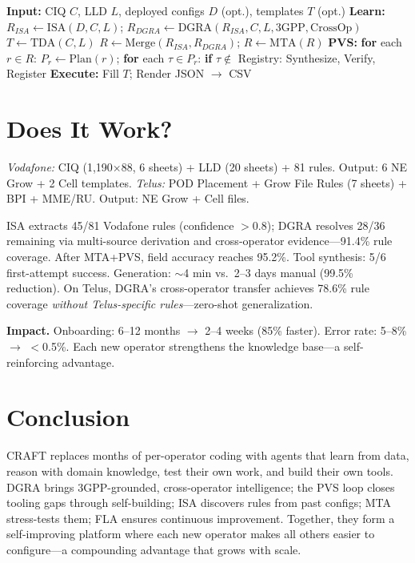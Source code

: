 \documentclass[10pt]{article}
\begin{document}
	\begin{algorithm}[h]
		\caption{CRAFT: Plan-Verify-Synthesize with DGRA}
		\begin{algorithmic}[1]
			\STATE \textbf{Input:} CIQ $C$, LLD $L$, deployed configs $D$ (opt.), templates $T$ (opt.)
			\STATE \textbf{Learn:} $R_{ISA} \leftarrow \text{ISA}(D, C, L)$; $R_{DGRA} \leftarrow \text{DGRA}(R_{ISA}, C, L, \text{3GPP}, \text{CrossOp})$
			 \STATE $T \leftarrow \text{TDA}(C, L)$ \ENDIF
			\STATE $R \leftarrow \text{Merge}(R_{ISA}, R_{DGRA})$; $R \leftarrow \text{MTA}(R)$
			\STATE \textbf{PVS:} \textbf{for} each $r \in R$: $P_r \leftarrow \text{Plan}(r)$; \textbf{for} each $\tau \in P_r$:
			\STATE \hspace{1em} \textbf{if} $\tau \notin$ Registry: Synthesize, Verify, Register
			\STATE \textbf{Execute:} Fill $T$; Render JSON $\to$ CSV
		\end{algorithmic}
	\end{algorithm}
	
	\section{Does It Work?}
	
	\emph{Vodafone:} CIQ (1,190$\times$88, 6 sheets) + LLD (20 sheets) + 81 rules. Output: 6 NE Grow + 2 Cell templates. \emph{Telus:} POD Placement + Grow File Rules (7 sheets) + BPI + MME/RU. Output: NE Grow + Cell files.
	
	ISA extracts 45/81 Vodafone rules (confidence $>0.8$); DGRA resolves 28/36 remaining via multi-source derivation and cross-operator evidence---91.4\% rule coverage. After MTA+PVS, field accuracy reaches 95.2\%. Tool synthesis: 5/6 first-attempt success. Generation: $\sim$4 min vs.\ 2--3 days manual (99.5\% reduction). On Telus, DGRA's cross-operator transfer achieves 78.6\% rule coverage \emph{without Telus-specific rules}---zero-shot generalization.
	
	\textbf{Impact.} Onboarding: 6--12 months $\to$ 2--4 weeks (85\% faster). Error rate: 5--8\% $\to$ $<$0.5\%. Each new operator strengthens the knowledge base---a self-reinforcing advantage.
	
	\section{Conclusion}
	
	CRAFT replaces months of per-operator coding with agents that learn from data, reason with domain knowledge, test their own work, and build their own tools. DGRA brings 3GPP-grounded, cross-operator intelligence; the PVS loop closes tooling gaps through self-building; ISA discovers rules from past configs; MTA stress-tests them; FLA ensures continuous improvement. Together, they form a self-improving platform where each new operator makes all others easier to configure---a compounding advantage that grows with scale.
	
\end{document}
